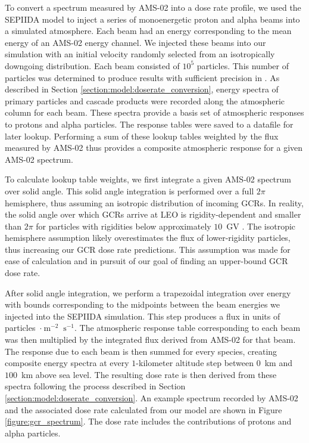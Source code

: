\documentclass[draft]{agujournal2019}
\begin{document}
To convert a spectrum measured by AMS-02 into a dose rate profile, we used the SEPIIDA model to inject a series of monoenergetic proton and alpha beams into a simulated atmosphere. Each beam had an energy corresponding to the mean energy of an AMS-02 energy channel. We injected these beams into our simulation with an initial velocity randomly selected from an isotropically downgoing distribution. Each beam consisted of $10^5$ particles. This number of particles was determined to produce results with sufficient precision in . As described in Section \ref{section:model:doserate_conversion}, energy spectra of primary particles and cascade products were recorded along the atmospheric column for each beam. These spectra provide a basis set of atmospheric responses to protons and alpha particles. The response tables were saved to a datafile for later lookup. Performing a sum of these lookup tables weighted by the flux measured by AMS-02 thus provides a composite atmospheric response for a given AMS-02 spectrum.

To calculate lookup table weights, we first integrate a given AMS-02 spectrum over solid angle. This solid angle integration is performed over a full $2\pi$ hemisphere, thus assuming an isotropic distribution of incoming GCRs. In reality, the solid angle over which GCRs arrive at LEO is rigidity-dependent and smaller than $2\pi$ for particles with rigidities below approximately $10$~GV \cite{chen2025}. The isotropic hemisphere assumption likely overestimates the flux of lower-rigidity particles, thus increasing our GCR dose rate predictions. This assumption was made for ease of calculation and in pursuit of our goal of finding an upper-bound GCR dose rate.

After solid angle integration, we perform a trapezoidal integration over energy with bounds corresponding to the midpoints between the beam energies we injected into the SEPIIDA simulation. This step produces a flux in units of particles~$\cdot~\text{m}^{-2}~\text{ s}^{-1}$. The atmospheric response table corresponding to each beam was then multiplied by the integrated flux derived from AMS-02 for that beam. The response due to each beam is then summed for every species, creating composite energy spectra at every $1$-kilometer altitude step between $0$~km and $100$~km above sea level. The resulting dose rate is then derived from these spectra following the process described in Section \ref{section:model:doserate_conversion}. An example spectrum recorded by AMS-02 and the associated dose rate calculated from our model are shown in Figure \ref{figure:gcr_spectrum}. The dose rate includes the contributions of protons and alpha particles. 
\end{document}
